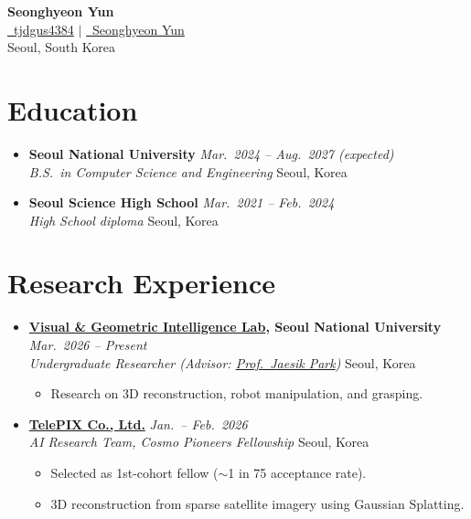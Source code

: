 \documentclass[10pt,a4paper]{article}
\newcommand{\entry}[4]{%
  \textbf{#1} \hfill \textit{#2} \\
  \textit{#3} \hfill #4
}
\begin{document}
\begin{center}
{\LARGE \textbf{Seonghyeon Yun}} \\[2pt]
\href{https://github.com/tjdgus4384}{\faGithub\ tjdgus4384} \quad $\vert$ \quad
\href{https://www.linkedin.com/in/seonghyeon-yun-0096142a0}{\faLinkedin\ Seonghyeon Yun} \\
Seoul, South Korea
\end{center}

\section*{Education}
\begin{itemize}
  \item \entry{Seoul National University}{Mar.~2024 -- Aug.~2027 (expected)}{B.S.~in Computer Science and Engineering}{Seoul, Korea}
  \item \entry{Seoul Science High School}{Mar.~2021 -- Feb.~2024}{High School diploma}{Seoul, Korea}
\end{itemize}

\section*{Research Experience}
\begin{itemize}
  \item \entry{\href{https://jaesik.info/lab}{Visual \& Geometric Intelligence Lab}, Seoul National University}{Mar.~2026 -- Present}{Undergraduate Researcher (Advisor: \href{https://jaesik.info}{Prof.~Jaesik Park})}{Seoul, Korea}
  \begin{itemize}
    \item Research on 3D reconstruction, robot manipulation, and grasping.
  \end{itemize}

  \item \entry{\href{https://www.telepix.net}{TelePIX Co., Ltd.}}{Jan.~-- Feb.~2026}{AI Research Team, Cosmo Pioneers Fellowship}{Seoul, Korea}
  \begin{itemize}
    \item Selected as 1st-cohort fellow ($\sim$1 in 75 acceptance rate).
    \item 3D reconstruction from sparse satellite imagery using Gaussian Splatting.
  \end{itemize}
\end{itemize}
\end{document}
